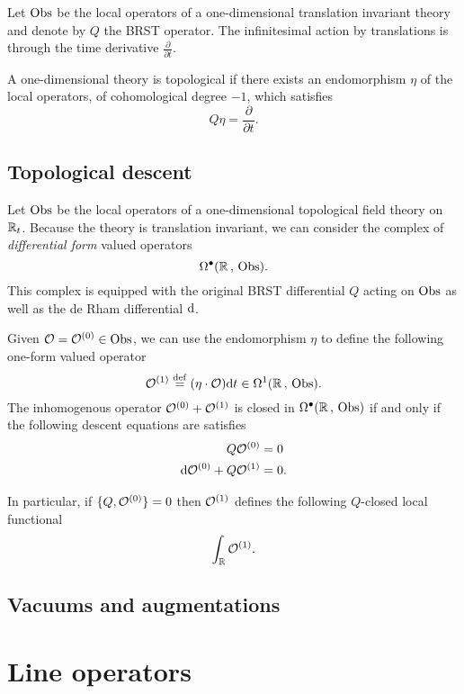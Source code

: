 \documentclass[11pt]{amsart}
\def\define{\overset{\rm def}{=}}
\begin{document}
Let ${\rm Obs}$ be the local operators of a one-dimensional translation invariant theory and denote by $Q$ the BRST operator. 
The infinitesimal action by translations is through the time derivative $\frac{\partial}{\partial t}$. 

A one-dimensional theory is topological if there exists an endomorphism $\eta$ of the local operators, of cohomological degree $-1$, which satisfies
\[
Q \eta = \frac{\partial}{\partial t} .
\]


\subsection{Topological descent} 

Let ${\rm Obs}$ be the local operators of a one-dimensional topological field theory on $\mathbb R_t$. 
Because the theory is translation invariant, we can consider the complex of {\em differential form} valued operators
\[
\Omega^\bullet(\mathbb R \, , \, {\rm Obs}) .
\]
This complex is equipped with the original BRST differential $Q$ acting on ${\rm Obs}$ as well as the de Rham differential ${\rm d}$. 

Given $\mathcal O = \mathcal O^{(0)} \in {\rm Obs}$, we can use the endomorphism $\eta$ to define the following one-form valued operator
\[
\cO^{(1)} \define (\eta \cdot \cO) \d t \in \Omega^1(\RR \, , \, \Obs).
\]
The inhomogenous operator $\mathcal O^{(0)} + \mathcal O^{(1)}$ is closed in $\Omega^\bullet(\mathbb R \, , \, {\rm Obs})$ if and only if the following descent equations are satisfies
\begin{align*}
Q \mathcal O^{(0)} & = 0 \\
{\rm d} \mathcal O^{(0)} + Q \mathcal O^{(1)} & = 0 .
\end{align*}

In particular, if $\{Q,\mathcal O^{(0)}\} = 0$ then $\mathcal O^{(1)}$ defines the following $Q$-closed local functional
\[
\int_\mathbb R \mathcal O^{(1)} .
\]


\subsection{Vacuums and augmentations}


\section{Line operators}
\end{document}
